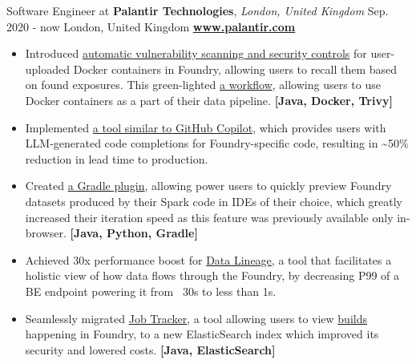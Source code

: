 \cveventflat
{Software Engineer at }
{\textbf{Palantir Technologies}, \textit{London, United Kingdom}}
{Sep. 2020 - now}
{London, United Kingdom}
\newline
\href{https://www.palantir.com/}{\textbf{www.palantir.com}}
\begin{itemize}
    \item {
        Introduced
        \href{https://www.palantir.com/docs/foundry/administration/container-governance/}{automatic vulnerability scanning and security controls}
        for user-uploaded Docker containers in Foundry, allowing users to recall them based on found exposures.
        This green-lighted
        \href{https://www.palantir.com/docs/foundry/transforms-python/container-overview/}{a workflow},
        allowing users to use Docker containers as a part of their data pipeline.
    }
    \newline
    \textbf{[Java, Docker, Trivy]}
    \item {
        Implemented
        \href{https://www.palantir.com/docs/foundry/code-repositories/aip-features/#code-autocomplete}{a tool similar to GitHub Copilot},
        which provides users with LLM-generated code completions for Foundry-specific code, resulting in
        \textasciitilde50\% reduction in lead time to production.
    }
    \item {
        Created
        \href{https://www.palantir.com/docs/foundry/transforms-common/local-preview/}{a Gradle plugin},
        allowing power users to quickly preview Foundry datasets produced by their Spark code in IDEs of their
        choice, which greatly increased their iteration speed as this feature was previously available only in-browser.
    }
    \textbf{[Java, Python, Gradle]}
    \item {
        Achieved 30x performance boost for
        \href{https://www.palantir.com/docs/foundry/data-lineage/overview/}{Data Lineage},
        a tool that facilitates a holistic view of how data flows through the Foundry,
        by decreasing P99 of a BE endpoint powering it from ~30s to less than 1s.
    }
    \item {
        Seamlessly migrated
        \href{https://www.palantir.com/docs/foundry/data-integration/application-reference/#builds}{Job Tracker},
        a tool allowing users to view
        \href{https://www.palantir.com/docs/foundry/data-integration/builds/}{builds}
        happening in Foundry, to a new ElasticSearch index which improved its security and lowered costs.
    }
    \textbf{[Java, ElasticSearch]}

\end{itemize}
